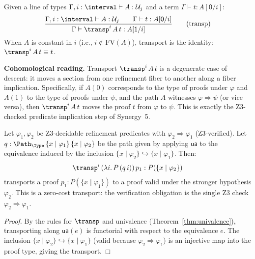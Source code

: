 \begin{definition}
\label{def:c4-transp}
Given a line of types $\Gamma, i : \interval \vdash A : \mathcal{U}_j$
and a term $\Gamma \vdash t : A[\mathsf{0}/i]$:
\[
\frac{\Gamma, i : \interval \vdash A : \mathcal{U}_j \qquad
      \Gamma \vdash t : A[\mathsf{0}/i]}
     {\Gamma \vdash \transp^i\, A\, t : A[\mathsf{1}/i]}
\tag{transp}
\]
When $A$ is constant in $i$ (i.e., $i \notin \mathrm{FV}(A)$), transport
is the identity: $\transp^i\, A\, t \equiv t$.

\medskip\noindent\textbf{Cohomological reading.}  Transport $\transp^i\, A\, t$
is a degenerate case of descent: it moves a section from one refinement fiber
to another along a fiber implication.  Specifically, if $A(0)$ corresponds to
the type of proofs under $\varphi$ and $A(1)$ to the type of proofs under
$\psi$, and the path $A$ witnesses $\varphi \Rightarrow \psi$ (or vice versa),
then $\transp^i\, A\, t$ moves the proof $t$ from $\varphi$ to $\psi$.  This
is exactly the Z3-checked predicate implication step of Synergy~5.
\end{definition}

\begin{proposition}
\label{prop:transp-implication}
Let $\varphi_1, \varphi_2$ be Z3-decidable refinement predicates with
$\varphi_2 \Rightarrow \varphi_1$ (Z3-verified).  Let
$q : \Path_\Type\, \{x \mid \varphi_1\}\, \{x \mid \varphi_2\}$
be the path given by applying $\mathsf{ua}$ to the equivalence
induced by the inclusion $\{x \mid \varphi_2\} \hookrightarrow
\{x \mid \varphi_1\}$.  Then:
\[
  \transp^i\, (\lambda i.\, P\,(q\,i))\, p_1 : P(\{x \mid \varphi_2\})
\]
transports a proof $p_1 : P(\{x \mid \varphi_1\})$ to a proof valid under
the stronger hypothesis $\varphi_2$.  This is a zero-cost transport: the
verification obligation is the single Z3 check $\varphi_2 \Rightarrow
\varphi_1$.
\end{proposition}

\begin{proof}
By the rules for $\transp$ and univalence (Theorem~\ref{thm:univalence}),
transporting along $\mathsf{ua}(e)$ is functorial with respect to the
equivalence $e$.  The inclusion $\{x \mid \varphi_2\} \hookrightarrow
\{x \mid \varphi_1\}$ (valid because $\varphi_2 \Rightarrow \varphi_1$)
is an injective map into the proof type, giving the transport.
\end{proof}

